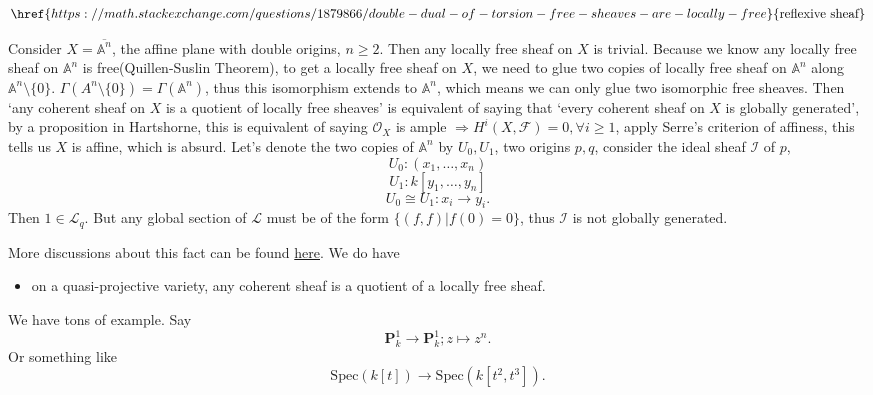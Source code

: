 \documentclass[main.tex]{subfiles}
\begin{document}
\begin{example}
$$\href{https://math.stackexchange.com/questions/1879866/double-dual-of-torsion-free-sheaves-are-locally-free}{\text{reflexive sheaf}}$$
\end{example}
\begin{example}
Consider $X=\overline{\mathbb{A}^{n}}$, the affine plane with double origins, $n\geq 2$. Then any locally free sheaf on $X$ is trivial. Because we know any locally free sheaf on $\mathbb{A}^{n}$ is free(Quillen-Suslin Theorem), to get a locally free sheaf on $X$, we need to glue two copies of locally free sheaf on $\mathbb{A}^{n}$ along $\mathbb{A}^{n}\setminus\{0\}$. $\Gamma(A^{n}\setminus\{0\})=\Gamma(\mathbb{A}^{n})$, thus this isomorphism extends to $\mathbb{A}^{n}$, which means we can only glue two isomorphic free sheaves. Then `any coherent sheaf on $X$ is a quotient of locally free sheaves' is equivalent of saying that `every coherent sheaf on $X$ is globally generated', by a proposition in Hartshorne, this is equivalent of saying $\mathcal{O}_{X}$ is ample $\Rightarrow H^{i}(X,\mathscr{F})=0, \forall i\geq 1$, apply Serre's criterion of affiness, this tells us $X$ is affine, which is absurd.  Let's  denote the two copies of $\mathbb{A}^{n}$ by $U_{0},U_{1}$, two origins $p,q$, consider the ideal sheaf $\mathscr{I}$ of $p$,
$$U_{0}:(x_{1}, \dots, x_{n})$$
$$U_{1}: k[y_{1},\dots, y_{n}]$$
$$U_{0}\cong U_{1}: x_{i}\rightarrow y_{i}.$$
Then $1\in \mathscr{L}_{q}$. But any global section of $\mathscr{L}$ must be of the form $\{(f,f)|f(0)=0\}$, thus $\mathscr{I}$ is not globally generated.
\end{example}
\begin{remark}
More discussions about this fact can be found \href{https://math.stackexchange.com/questions/849958/is-there-a-coherent-sheaf-which-is-not-a-quotient-of-locally-free-sheaf}{here}. We do have 
\begin{itemize}
\item on a quasi-projective variety, any coherent sheaf is a quotient of a locally free sheaf.
\end{itemize}
\end{remark}




\begin{example}
We have tons of example. Say 
$$\mathbf{P}_{k}^{1}\rightarrow \mathbf{P}_{k}^{1}; z\mapsto z^{n}.$$ Or something like
$$\mathrm{Spec}(k[t]) \rightarrow\mathrm{Spec}(k[t^{2},t^{3}]).$$
\end{example}
\end{document}
